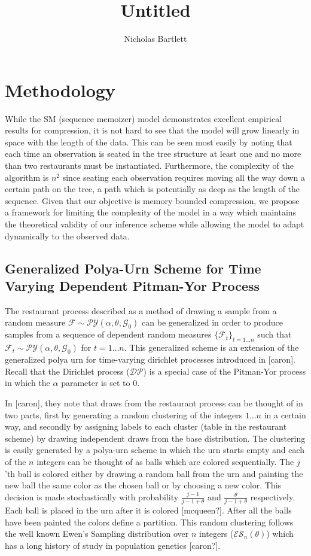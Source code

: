 \documentclass[12pt]{amsart}
\title{Untitled}
\author{Nicholas Bartlett}
\newcommand{\F}{\mathcal{F}}
\newcommand{\PY}{\mathcal{P}\mathcal{Y}}
\newcommand{\G}{\mathcal{G}}
\newcommand{\ES}{\mathcal{E}\mathcal{S}}
\newcommand{\DP}{\mathcal{D}\mathcal{P}}
\begin{document}
\maketitle
\section{Methodology}

While the SM (sequence memoizer) model demonstrates excellent empirical results for compression, it is not hard to see that the model will grow linearly in space with the length of the data.  This can be seen most easily by noting that each time an observation is seated in the tree structure at least one and no more than two restaurants must be instantiated.  Furthermore, the complexity of the algorithm is $n^2$ since seating each observation requires moving all the way down a certain path on the tree, a path which is potentially as deep as the length of the sequence.  Given that our objective is memory bounded compression, we propose a framework for limiting the complexity of the model in a way which maintains the theoretical validity of our inference scheme while allowing the model to adapt dynamically to the observed data.\\

\subsection{Generalized Polya-Urn Scheme for Time Varying Dependent Pitman-Yor Process} 

The restaurant process described as a method of drawing a sample from a random measure $\F \sim \PY(\alpha, \theta,\G_0)$ can be generalized in order to produce samples from a sequence of dependent random measures $\{\F_t\}_{t =1 \ldots n}$ such that $\F_t \sim \PY(\alpha, \theta,\G_0)$ for $t = 1 \dots n$.  This generalized scheme is an extension of the generalized polya urn for time-varying dirichlet processes introduced in [caron].  Recall that the Dirichlet process ($\DP$) is a special case of the Pitman-Yor process in which the $\alpha$ parameter is set to $0$. 

In [caron], they note that draws from the restaurant process can be thought of in two parts, first by generating  a random clustering of the integers $1 \dots n$ in a certain way, and secondly by assigning labels to each cluster (table in the restaurant scheme) by drawing independent draws from the base distribution.  The clustering is easily generated by a polya-urn scheme in which the urn starts empty and each of the $n$ integers can be thought of as balls which are colored sequentially.  The $j$'th ball is colored either by drawing a random ball from the urn and painting the new ball the same color as the chosen ball or by choosing a new color.  This decision is made stochastically with probability $\frac{j-1}{j - 1 +\theta}$ and $\frac{\theta}{j-1+\theta}$ respectively.  Each ball is placed in the urn after it is colored [mcqueen?]. After all the balls have been painted the colors define a partition. This random clustering follows the well known Ewen's Sampling distribution over $n$ integers ($\ES_n(\theta)$) which has a long history of study in population genetics [caron?].  
\end{document}
